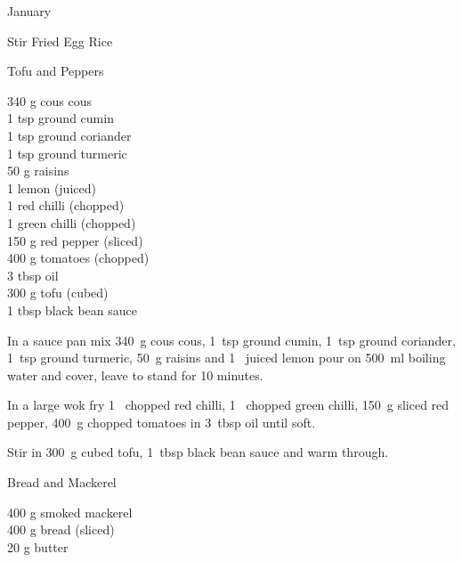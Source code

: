 \begin{menu}{January}
\begin{recipe}{2}{Stir Fried Egg Rice}
\begin{instructions}
    \end{instructions}
    \end{recipe}%
  
    \begin{recipe}{2}{Tofu and Peppers}%
		\begin{ingredients}
		340 g cous cous  \\
	1 tsp ground cumin  \\
	1 tsp ground coriander  \\
	1 tsp ground turmeric  \\
	50 g raisins  \\
	1  lemon (juiced) \\
	1  red chilli (chopped) \\
	1  green chilli (chopped) \\
	150 g red pepper (sliced) \\
	400 g tomatoes (chopped) \\
	3 tbsp oil  \\
	300 g tofu (cubed) \\
	1 tbsp black bean sauce  \\
	
		\end{ingredients}
	
	
    \begin{instructions}
    \item 
    In a
    sauce pan
    mix
    340~g  cous cous,
    1~tsp  ground cumin,
    1~tsp  ground coriander,
    1~tsp  ground turmeric,
    50~g  raisins
    and
    1~ juiced lemon
    pour on
    500~ml  boiling water
    and cover, leave to stand for 10 minutes.
  \item 
        In a large wok fry
        1~ chopped red chilli,
        1~ chopped green chilli,
        150~g sliced red pepper,
        400~g chopped tomatoes
        in
        3~tbsp  oil
        until soft.
      \item 
        Stir in
        300~g cubed tofu,
        1~tbsp  black bean sauce
        and warm through.
      
    \end{instructions}
    \end{recipe}%
  
    \begin{recipe}{1}{Bread and Mackerel}%
		\begin{ingredients}
		400 g smoked mackerel  \\
	400 g bread (sliced) \\
	20 g butter  \\
	

\end{ingredients}
\end{recipe}
\end{menu}
